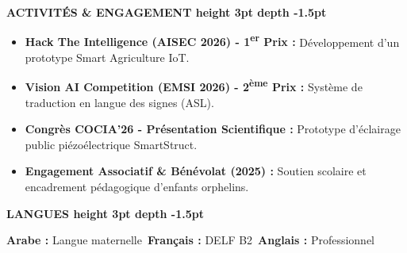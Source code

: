 \documentclass[10pt,a4paper]{altacv}
\renewcommand{\cvsection}[2][]{%
  \vspace{3pt}%
  {\color{heading}\Large\bfseries #2 \hspace{0.2em}\leaders\vrule height 3pt depth -1.5pt\hfill\mbox{}}\par\vspace{2.5pt}
}
\newenvironment{cvitems}{\begin{itemize}[leftmargin=*, label=\textbullet, nosep, itemsep=1.5pt]}{\end{itemize}}
\begin{document}
\cvsection{ACTIVITÉS \& ENGAGEMENT}
\begin{cvitems}
  \item \textbf{Hack The Intelligence (AISEC 2026) - 1\textsuperscript{er} Prix :} Développement d’un prototype Smart Agriculture IoT.
  \item \textbf{Vision AI Competition (EMSI 2026) - 2\textsuperscript{ème} Prix :} Système de traduction en langue des signes (ASL).
  \item \textbf{Congrès COCIA’26 - Présentation Scientifique :} Prototype d’éclairage public piézoélectrique SmartStruct.
  \item \textbf{Engagement Associatif \& Bénévolat (2025) :} Soutien scolaire et encadrement pédagogique d’enfants orphelins.
\end{cvitems}

\cvsection{LANGUES}
\textbf{Arabe :} Langue maternelle~\hfill \textbf{Français :} DELF B2~\hfill \textbf{Anglais :} Professionnel
\end{document}
